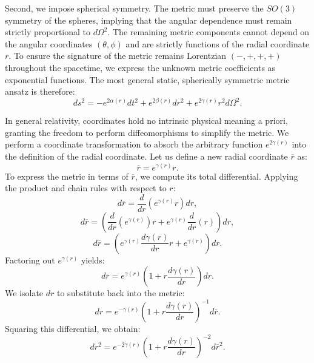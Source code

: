 \documentclass[11pt, a4paper]{report}
\begin{document}
Second, we impose spherical symmetry. The metric must preserve the $SO(3)$ symmetry of the spheres, implying that the angular dependence must remain strictly proportional to $d\Omega^2$. The remaining metric components cannot depend on the angular coordinates $(\theta, \phi)$ and are strictly functions of the radial coordinate $r$. To ensure the signature of the metric remains Lorentzian $(-, +, +, +)$ throughout the spacetime, we express the unknown metric coefficients as exponential functions. The most general static, spherically symmetric metric ansatz is therefore:
\begin{equation}
ds^2 = -e^{2\alpha(r)} dt^2 + e^{2\beta(r)} dr^2 + e^{2\gamma(r)} r^2 d\Omega^2.
\end{equation}

In general relativity, coordinates hold no intrinsic physical meaning a priori, granting the freedom to perform diffeomorphisms to simplify the metric. We perform a coordinate transformation to absorb the arbitrary function $e^{2\gamma(r)}$ into the definition of the radial coordinate. Let us define a new radial coordinate $\overline{r}$ as:
\begin{equation}
\overline{r} = e^{\gamma(r)} r.
\end{equation}
To express the metric in terms of $\overline{r}$, we compute its total differential. Applying the product and chain rules with respect to $r$:
\begin{equation}
d\overline{r} = \frac{d}{dr} \left( e^{\gamma(r)} r \right) dr,
\end{equation}
\begin{equation}
d\overline{r} = \left( \frac{d}{dr} \left( e^{\gamma(r)} \right) r + e^{\gamma(r)} \frac{d}{dr} (r) \right) dr,
\end{equation}
\begin{equation}
d\overline{r} = \left( e^{\gamma(r)} \frac{d\gamma(r)}{dr} r + e^{\gamma(r)} \right) dr.
\end{equation}
Factoring out $e^{\gamma(r)}$ yields:
\begin{equation}
d\overline{r} = e^{\gamma(r)} \left( 1 + r \frac{d\gamma(r)}{dr} \right) dr.
\end{equation}
We isolate $dr$ to substitute back into the metric:
\begin{equation}
dr = e^{-\gamma(r)} \left( 1 + r \frac{d\gamma(r)}{dr} \right)^{-1} d\overline{r}.
\end{equation}
Squaring this differential, we obtain:
\begin{equation}
dr^2 = e^{-2\gamma(r)} \left( 1 + r \frac{d\gamma(r)}{dr} \right)^{-2} d\overline{r}^2.
\end{equation}
\end{document}
